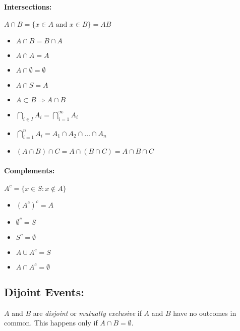 \documentclass{article}
\begin{document}
\begin{multicols}{3}
        \paragraph*{Intersections: } \( A \cap B = \{ x \in A \text{ and } x \in B\} = AB \)            
            \begin{itemize}
                \item[] \(A \cap B = B \cap A \)
                \item[] \(A \cap A = A \)
                \item[] \(A \cap \emptyset = \emptyset \)
                \item[] \(A \cap S = A\)
                \item[] \(A \subset B \Rightarrow A \cap B\)
                \item[] \(\bigcap\limits_{i\in I}A_i = \bigcap\limits_{i=1}^{\infty}A_i\)
                \item[] \(\bigcap\limits_{i=1}^{n}A_i = A_1 \cap A_2 \cap \dots \cap A_n \)
                \item[] \( (A \cap B) \cap C = A \cap (B \cap C) = A \cap B \cap C\)
            \end{itemize}
        \paragraph*{Complements: } \(A^c = \{x \in S: x \notin A\}\)
            \begin{itemize}
                \item[] \((A^c)^c = A\)
                \item[] \(\emptyset^c = S\)
                \item[] \(S^c = \emptyset\)
                \item[] \(A\cup A^c = S\)
                \item[] \(A \cap A^c = \emptyset\)
            \end{itemize}
    \subsection*{Dijoint Events: } $A$ and $B$ are \textit{disjoint} or \textit{mutually exclusive} if $A$ and $B$ have no outcomes in common. This happens only if \(A \cap B = \emptyset \).

\end{multicols}
\end{document}
